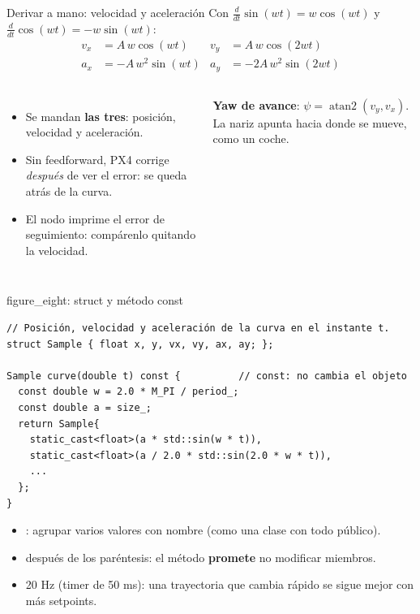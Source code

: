 \begin{frame}{Derivar a mano: velocidad y aceleración}
  \small Con $\frac{d}{dt}\sin(wt) = w\cos(wt)$ y $\frac{d}{dt}\cos(wt) = -w\sin(wt)$:
  \[
    \begin{aligned}
      v_x &= A\,w\cos(wt) & v_y &= A\,w\cos(2wt) \\
      a_x &= -A\,w^2\sin(wt) & a_y &= -2A\,w^2\sin(2wt)
    \end{aligned}
  \]
  \begin{columns}[c]
    \begin{itemize}
      \item Se mandan \textbf{las tres}: posición, velocidad y aceleración.
      \item Sin feedforward, PX4 corrige \emph{después} de ver el error: se queda atrás de la curva.
      \item El nodo imprime el error de seguimiento: compárenlo quitando la velocidad.
    \end{itemize}
    \begin{idea}
      \small \textbf{Yaw de avance}: $\psi = \operatorname{atan2}(v_y, v_x)$. La nariz apunta hacia donde
      se mueve, como un coche.
    \end{idea}
  \end{columns}
\end{frame}

\begin{frame}[fragile]{figure\_eight: struct y método const}
  \begin{lstlisting}[style=cpp,caption={figure\_eight.cpp}]
// Posición, velocidad y aceleración de la curva en el instante t.
struct Sample { float x, y, vx, vy, ax, ay; };

Sample curve(double t) const {          // const: no cambia el objeto
  const double w = 2.0 * M_PI / period_;
  const double a = size_;
  return Sample{
    static_cast<float>(a * std::sin(w * t)),
    static_cast<float>(a / 2.0 * std::sin(2.0 * w * t)),
    ...
  };
}
  \end{lstlisting}
  \small
  \begin{itemize}
    \item {}: agrupar varios valores con nombre (como una clase con todo público).
    \item {} después de los paréntesis: el método \textbf{promete} no modificar miembros.
    \item 20 Hz (timer de 50 ms): una trayectoria que cambia rápido se sigue mejor con más setpoints.
  \end{itemize}
\end{frame}

